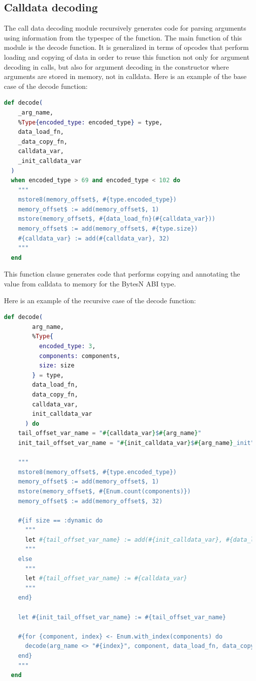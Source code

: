 \subsection{Calldata decoding}
\label{ssec:calldata_decoding}
The call data decoding module recursively generates code for parsing arguments using information from the typespec of the function. The main function of this module is the decode function. It is generalized in terms of opcodes that perform loading and copying of data in order to reuse this function not only for argument decoding in calls, but also for argument decoding in the constructor where arguments are stored in memory, not in calldata. Here is an example of the base case of the decode function:

\begin{lstlisting}[caption={Calldata decoding base case}, language=elixir, label={lst:calldata_decoding_base}]
  def decode(
    _arg_name,
    %Type{encoded_type: encoded_type} = type,
    data_load_fn,
    _data_copy_fn,
    calldata_var,
    _init_calldata_var
  )
  when encoded_type > 69 and encoded_type < 102 do
    """
    mstore8(memory_offset$, #{type.encoded_type})
    memory_offset$ := add(memory_offset$, 1)
    mstore(memory_offset$, #{data_load_fn}(#{calldata_var}))
    memory_offset$ := add(memory_offset$, #{type.size})
    #{calldata_var} := add(#{calldata_var}, 32)
    """
  end
\end{lstlisting}

This function clause generates code that performs copying and annotating the value from calldata to memory for the BytesN ABI type.

Here is an example of the recursive case of the decode function:

\begin{lstlisting}[caption={Calldata decoding recursive case}, language=elixir, label={lst:calldata_decoding_recursive}]
  def decode(
        arg_name,
        %Type{
          encoded_type: 3,
          components: components,
          size: size
        } = type,
        data_load_fn,
        data_copy_fn,
        calldata_var,
        init_calldata_var
      ) do
    tail_offset_var_name = "#{calldata_var}$#{arg_name}"
    init_tail_offset_var_name = "#{init_calldata_var}$#{arg_name}_init"

    """
    mstore8(memory_offset$, #{type.encoded_type})
    memory_offset$ := add(memory_offset$, 1)
    mstore(memory_offset$, #{Enum.count(components)})
    memory_offset$ := add(memory_offset$, 32)

    #{if size == :dynamic do
      """
      let #{tail_offset_var_name} := add(#{init_calldata_var}, #{data_load_fn}(#{calldata_var}))
      """
    else
      """
      let #{tail_offset_var_name} := #{calldata_var}
      """
    end}

    let #{init_tail_offset_var_name} := #{tail_offset_var_name}

    #{for {component, index} <- Enum.with_index(components) do
      decode(arg_name <> "#{index}", component, data_load_fn, data_copy_fn, tail_offset_var_name, init_tail_offset_var_name)
    end}
    """
  end
\end{lstlisting}

